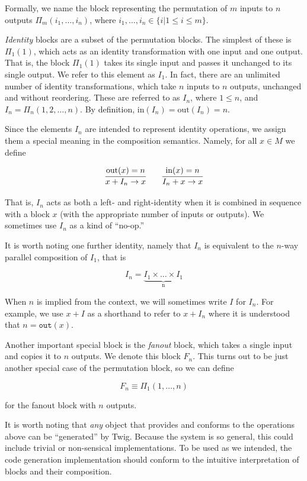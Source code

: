 Formally, we name the block representing the permutation of $m$ inputs to $n$ outputs $\Pi_m(i_1,\ldots,i_n)$, where $i_1,\ldots,i_n \in \lbrace i | 1 \leq i \leq m \rbrace$.

\emph{Identity} blocks are a subset of the permutation blocks. The simplest of these is $\Pi_1(1)$, which acts as an identity transformation with one input and one output. That is, the block $\Pi_1(1)$ takes its single input and passes it unchanged to its single output. We refer to this element as $I_1$. In fact, there are an unlimited number of identity transformations, which take $n$ inputs to $n$ outputs, unchanged and without reordering. These are referred to as $I_n$, where $1 \leq n$, and $I_n = \Pi_n(1,2,\ldots,n)$. By definition, $\mbox{in}(I_n) = \mbox{out}(I_n) = n$.

Since the elements $I_n$ are intended to represent identity operations, we assign them a special meaning in the composition semantics. Namely, for all $x \in M$ we define

\[
\infer
  {x + I_n \to x}
  {\mbox{out}(x) = n}
\qquad
\infer
  {I_n + x \to x}
  {\mbox{in}(x) = n}
\]

That is, $I_n$ acts as both a left- and right-identity when it is combined in sequence with a block $x$ (with the appropriate number of inputs or outputs). We sometimes use $I_n$ as a kind of ``no-op.''

It is worth noting one further identity, namely that $I_n$ is equivalent to the $n$-way parallel composition of $I_1$, that is

\[
I_n = \underbrace{I_1 \times \ldots \times I_1}_\text{n}
\]

When $n$ is implied from the context, we will sometimes write $I$ for $I_n$. For example, we use $x+I$ as a shorthand to refer to $x+I_n$ where it is understood that $n = \mathtt{out}(x)$.

Another important special block is the \emph{fanout} block, which takes a single input and copies it to $n$ outputs. We denote this block $F_n$. This turns out to be just another special case of the permutation block, so we can define 

\[
F_n \equiv \Pi_1(1,\ldots,n) 
\]

for the fanout block with $n$ outputs.

It is worth noting that \emph{any} object that provides and conforms to the operations above can be ``generated'' by Twig. Because the system is so general, this could include trivial or non-sensical implementations. To be used as we intended, the code generation implementation should conform to the intuitive interpretation of blocks and their composition.


